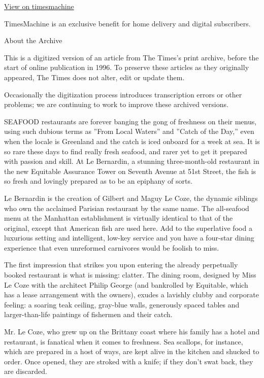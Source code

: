 \href{http://timesmachine.nytimes3xbfgragh.onion/timesmachine/1986/03/28/023486.html}{View
on timesmachine}

TimesMachine is an exclusive benefit for home delivery and digital
subscribers.

About the Archive

This is a digitized version of an article from The Times's print
archive, before the start of online publication in 1996. To preserve
these articles as they originally appeared, The Times does not alter,
edit or update them.

Occasionally the digitization process introduces transcription errors or
other problems; we are continuing to work to improve these archived
versions.

SEAFOOD restaurants are forever banging the gong of freshness on their
menus, using such dubious terms as ''From Local Waters'' and ''Catch of
the Day,'' even when the locale is Greenland and the catch is iced
onboard for a week at sea. It is so rare these days to find really fresh
seafood, and rarer yet to get it prepared with passion and skill. At Le
Bernardin, a stunning three-month-old restaurant in the new Equitable
Assurance Tower on Seventh Avenue at 51st Street, the fish is so fresh
and lovingly prepared as to be an epiphany of sorts.

Le Bernardin is the creation of Gilbert and Maguy Le Coze, the dynamic
siblings who own the acclaimed Parisian restaurant by the same name. The
all-seafood menu at the Manhattan establishment is virtually identical
to that of the original, except that American fish are used here. Add to
the superlative food a luxurious setting and intelligent, low-key
service and you have a four-star dining experience that even unreformed
carnivores would be foolish to miss.

The first impression that strikes you upon entering the already
perpetually booked restaurant is what is missing: clatter. The dining
room, designed by Miss Le Coze with the architect Philip George (and
bankrolled by Equitable, which has a lease arrangement with the owners),
exudes a lavishly clubby and corporate feeling: a soaring teak ceiling,
gray-blue walls, generously spaced tables and larger-than-life paintings
of fishermen and their catch.

Mr. Le Coze, who grew up on the Brittany coast where his family has a
hotel and restaurant, is fanatical when it comes to freshness. Sea
scallops, for instance, which are prepared in a host of ways, are kept
alive in the kitchen and shucked to order. Once opened, they are stroked
with a knife; if they don't swat back, they are discarded.

